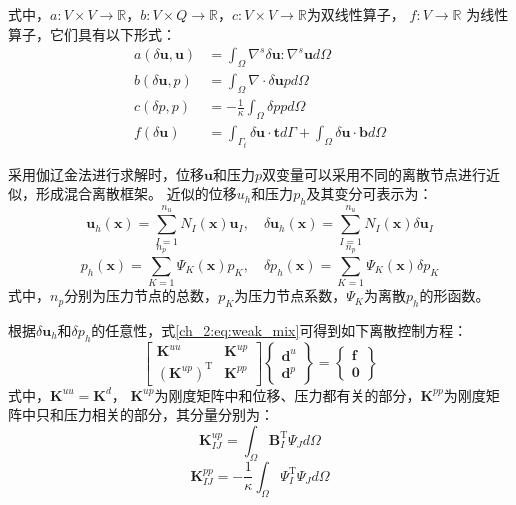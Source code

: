 式中，$a: V\times V\rightarrow \mathbb R$，$b: V\times Q\rightarrow \mathbb R$，$c: V\times V\rightarrow \mathbb R$为双线性算子， $f: V \rightarrow \mathbb R$ 为线性算子，它们具有以下形式：
\begin{align}
    a(\delta \boldsymbol u, \boldsymbol u) &= \int_\Omega \nabla^s \delta \boldsymbol u: \nabla^s \boldsymbol u d\Omega \\
    b(\delta \boldsymbol u, p) &= \int_\Omega \nabla \cdot \delta \boldsymbol u p d\Omega \\
    c(\delta p,p) &= -\frac{1}{\kappa}\int_\Omega\delta p p d\Omega \\
    f(\delta \boldsymbol u) &= \int_{\Gamma_t} \delta \boldsymbol u \cdot \boldsymbol t d\Gamma + \int_{\Omega} \delta \boldsymbol u \cdot \boldsymbol b d\Omega
\end{align}

采用伽辽金法进行求解时，位移$\boldsymbol u$和压力$p$双变量可以采用不同的离散节点进行近似，形成混合离散框架。
近似的位移$u_h$和压力$p_h$及其变分可表示为：
\begin{equation}\label{ch_2:eq:u_h_mix}
    \boldsymbol u_h(\boldsymbol x) = \sum_{I=1}^{n_u} N_I(\boldsymbol x) \boldsymbol u_I, \quad
    \delta \boldsymbol u_h(\boldsymbol x) = \sum_{I=1}^{n_u} N_I(\boldsymbol x) \delta \boldsymbol u_I
\end{equation}
\begin{equation}\label{ch_2:eq:p_h_mix}
    p_h(\boldsymbol x) = \sum_{K=1}^{n_p} \Psi_K(\boldsymbol x) p_K, \quad
    \delta p_h(\boldsymbol x) = \sum_{K=1}^{n_p} \Psi_K(\boldsymbol x) \delta p_K
\end{equation}
式中，$n_p$分别为压力节点的总数，$p_K$为压力节点系数，$\Psi_K$为离散$p_h$的形函数。

根据$\delta \boldsymbol  u_h$和$\delta p_h$的任意性，式\eqref{ch_2:eq:weak_mix}可得到如下离散控制方程：
\begin{equation}\label{equilibrium_mix}
    \begin{bmatrix}
        \boldsymbol K^{uu} & \boldsymbol K^{up} \\ (\boldsymbol K^{up})^{\mathrm T} & \boldsymbol K^{pp}
    \end{bmatrix}
    \begin{Bmatrix}
        \boldsymbol d^u \\ \boldsymbol d^p 
    \end{Bmatrix} =
    \begin{Bmatrix}
        \boldsymbol f \\ \boldsymbol 0 
    \end{Bmatrix}
\end{equation}
式中，$\boldsymbol K^{uu} = \boldsymbol K^d$， $\boldsymbol{K}^{up}$为刚度矩阵中和位移、压力都有关的部分，$\boldsymbol{K}^{pp}$为刚度矩阵中只和压力相关的部分，其分量分别为：
\begin{equation}
    \boldsymbol{K}^{up}_{I J}=\int_{\Omega} \boldsymbol B_{I}^{\mathrm T} \Psi_{J} {d} \Omega
\end{equation}
\begin{equation}  
    \boldsymbol{K}^{pp}_{IJ}=-\frac{1}{\kappa}\int_{\Omega}  \Psi^\mathrm{T}_{I}  \Psi_{J}d\Omega
\end{equation}

